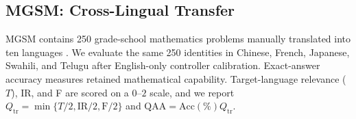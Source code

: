 \FloatBarrier



\subsection{MGSM: Cross-Lingual Transfer}
\label{app:mgsm-full}

MGSM contains 250 grade-school mathematics problems manually translated into
ten languages \citep{shi2023language}.  We evaluate the same 250 identities in
Chinese, French, Japanese, Swahili, and Telugu after English-only controller
calibration.  Exact-answer accuracy measures retained mathematical capability.
Target-language relevance ($T$), IR, and F are scored on a $0$--$2$ scale, and
we report
$Q_{\mathrm{tr}}=\min\{T/2,\mathrm{IR}/2,\mathrm{F}/2\}$ and
$\mathrm{QAA}=\mathrm{Acc}(\%)Q_{\mathrm{tr}}$.

